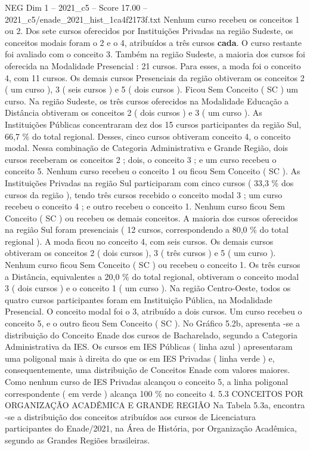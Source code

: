 \begin{textsample}{NEG Dim 1 – 2021\_c5 – Score 17.00 – 2021\_c5/enade\_2021\_hist\_1ca4f2173f.txt}
Nenhum curso recebeu os conceitos 1 ou 2.
Dos sete cursos oferecidos por Instituições Privadas na região Sudeste, os conceitos modais foram o 2 e o 4, atribuídos a três cursos \textbf{cada}.
O curso restante foi avaliado com o conceito 3.
Também na região Sudeste, a maioria dos cursos foi oferecida na Modalidade Presencial : 21 cursos.
Para esses, a moda foi o conceito 4, com 11 cursos.
Os demais cursos Presenciais da região obtiveram os conceitos 2 ( um curso ), 3 ( seis cursos ) e 5 ( dois cursos ).
Ficou Sem Conceito ( SC ) um curso.
Na região Sudeste, os três cursos oferecidos na Modalidade Educação a Distância obtiveram os conceitos 2 ( dois cursos ) e 3 ( um curso ).
As Instituições Públicas concentraram dez dos 15 cursos participantes da região Sul, 66,7 \% do total regional.
Desses, cinco cursos obtiveram conceito 4, o conceito modal.
Nessa combinação de Categoria Administrativa e Grande Região, dois cursos receberam os conceitos 2 ; dois, o conceito 3 ; e um curso recebeu o conceito 5.
Nenhum curso recebeu o conceito 1 ou ficou Sem Conceito ( SC ).
As Instituições Privadas na região Sul participaram com cinco cursos ( 33,3 \% dos cursos da região ), tendo três cursos recebido o conceito modal 3 ; um curso recebeu o conceito 4 ; e outro recebeu o conceito 1.
Nenhum curso ficou Sem Conceito ( SC ) ou recebeu os demais conceitos.
A maioria dos cursos oferecidos na região Sul foram presenciais ( 12 cursos, correspondendo a 80,0 \% do total regional ).
A moda ficou no conceito 4, com seis cursos.
Os demais cursos obtiveram os conceitos 2 ( dois cursos ), 3 ( três cursos ) e 5 ( um curso ).
Nenhum curso ficou Sem Conceito ( SC ) ou recebeu o conceito 1.
Os três cursos a Distância, equivalentes a 20,0 \% do total regional, obtiveram o conceito modal 3 ( dois cursos ) e o conceito 1 ( um curso ).
Na região Centro-Oeste, todos os quatro cursos participantes foram em Instituição Pública, na Modalidade Presencial.
O conceito modal foi o 3, atribuído a dois cursos.
Um curso recebeu o conceito 5, e o outro ficou Sem Conceito ( SC ).
No Gráfico 5.2b, apresenta -se a distribuição do Conceito Enade dos cursos de Bacharelado, segundo a Categoria Administrativa da IES.
Os cursos em IES Públicas ( linha azul ) apresentaram uma poligonal mais à direita do que os em IES Privadas ( linha verde ) e, consequentemente, uma distribuição de Conceitos Enade com valores maiores.
Como nenhum curso de IES Privadas alcançou o conceito 5, a linha poligonal correspondente ( em verde ) alcança 100 \% no conceito 4. 5.3 CONCEITOS POR ORGANIZAÇÃO ACADÊMICA E GRANDE REGIÃO Na Tabela 5.3a, encontra -se a distribuição dos conceitos atribuídos aos cursos de Licenciatura participantes do Enade/2021, na Área de História, por Organização Acadêmica, segundo as Grandes Regiões brasileiras.

\end{textsample}
